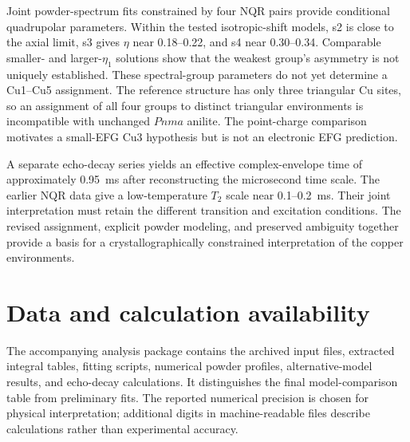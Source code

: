 \documentclass[10pt,a4paper,twocolumn]{article}
\begin{document}
Joint powder-spectrum fits constrained by four NQR pairs provide conditional quadrupolar parameters. Within the tested isotropic-shift models, s2 is close to the axial limit, s3 gives $\eta$ near 0.18--0.22, and s4 near 0.30--0.34. Comparable smaller- and larger-$\eta_1$ solutions show that the weakest group's asymmetry is not uniquely established. These spectral-group parameters do not yet determine a Cu1--Cu5 assignment. The reference structure has only three triangular Cu sites, so an assignment of all four groups to distinct triangular environments is incompatible with unchanged $Pnma$ anilite. The point-charge comparison motivates a small-EFG Cu3 hypothesis but is not an electronic EFG prediction.

A separate echo-decay series yields an effective complex-envelope time of approximately 0.95~ms after reconstructing the microsecond time scale. The earlier NQR data give a low-temperature $T_2$ scale near 0.1--0.2~ms. Their joint interpretation must retain the different transition and excitation conditions. The revised assignment, explicit powder modeling, and preserved ambiguity together provide a basis for a crystallographically constrained interpretation of the copper environments.

\section*{Data and calculation availability}

The accompanying analysis package contains the archived input files, extracted integral tables, fitting scripts, numerical powder profiles, alternative-model results, and echo-decay calculations. It distinguishes the final model-comparison table from preliminary fits. The reported numerical precision is chosen for physical interpretation; additional digits in machine-readable files describe calculations rather than experimental accuracy.



\end{document}
